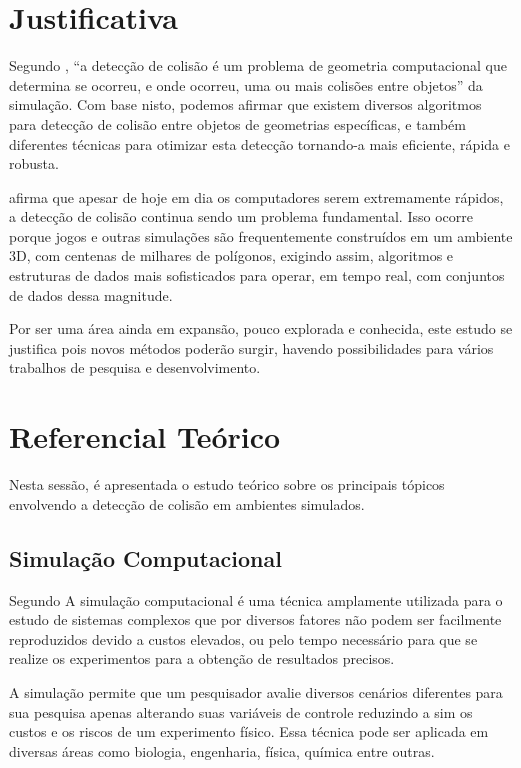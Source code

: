 \section{Justificativa}

Segundo , “a detecção de colisão é um problema de geometria computacional que determina se ocorreu, e onde ocorreu, uma ou mais colisões entre objetos” da simulação. Com base nisto, podemos afirmar que existem diversos algoritmos para detecção de colisão entre objetos de geometrias específicas, e também diferentes técnicas para otimizar esta detecção tornando-a mais eficiente, rápida e robusta.

 afirma que apesar de hoje em dia os computadores serem extremamente rápidos, a detecção de colisão continua sendo um problema fundamental. Isso ocorre porque jogos e outras simulações são frequentemente construídos em um ambiente 3D, com centenas de milhares de polígonos, exigindo assim, algoritmos e estruturas de dados mais sofisticados para operar, em tempo real, com conjuntos de dados dessa magnitude.

Por ser uma área ainda em expansão, pouco explorada e conhecida, este estudo se justifica pois novos métodos poderão surgir, havendo possibilidades para vários trabalhos de pesquisa e desenvolvimento.

\section{Referencial Teórico}

Nesta sessão, é apresentada o estudo teórico sobre os principais tópicos envolvendo a detecção de colisão em ambientes simulados.

\subsection{Simulação Computacional}

Segundo  A simulação computacional é uma técnica amplamente utilizada para o estudo de
sistemas complexos que por diversos fatores não podem ser facilmente
reproduzidos devido a custos elevados, ou pelo tempo necessário para que se
realize os experimentos para a obtenção de resultados precisos.

A simulação permite que um pesquisador avalie diversos cenários diferentes para sua
pesquisa apenas alterando suas variáveis de controle reduzindo a sim os custos
e os riscos de um experimento físico. Essa técnica pode ser aplicada em
diversas áreas como biologia, engenharia, física, química entre outras.

